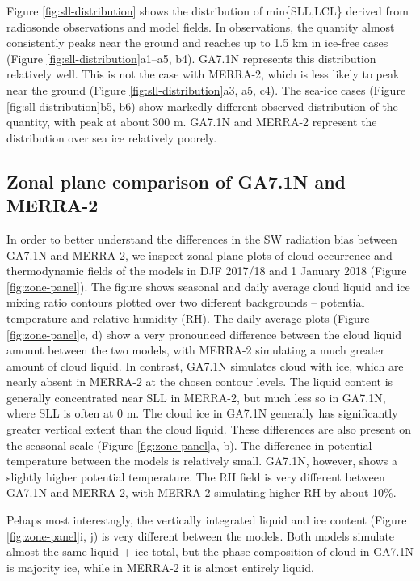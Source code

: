 Figure \ref{fig:sll-distribution} shows the distribution of min\{SLL,LCL\}
derived from radiosonde observations and model fields. In observations, the
quantity almost consistently peaks near the ground and reaches up to 1.5 km in
ice-free cases (Figure \ref{fig:sll-distribution}a1--a5, b4). GA7.1N represents
this distribution relatively well. This is not the case with MERRA-2, which is
less likely to peak near the ground (Figure \ref{fig:sll-distribution}a3, a5, c4).
The sea-ice cases (Figure \ref{fig:sll-distribution}b5, b6)
show markedly different observed distribution of the quantity, with peak at
about 300 m.  GA7.1N and MERRA-2 represent the distribution over sea ice
relatively poorely.

\subsection{Zonal plane comparison of GA7.1N and MERRA-2}
\label{sec:zonal-plane-comparison}

In order to better understand the differences in the SW radiation bias between
GA7.1N and MERRA-2, we inspect zonal plane plots of cloud occurrence and
thermodynamic fields of the models in DJF 2017/18 and 1 January 2018 (Figure
\ref{fig:zone-panel}). The figure shows seasonal and daily average cloud liquid
and ice mixing ratio contours plotted over two different backgrounds --
potential temperature and relative humidity (RH). The daily average plots
(Figure \ref{fig:zone-panel}c, d) show a very pronounced difference between
the cloud liquid amount between the two models, with MERRA-2 simulating a much
greater amount of cloud liquid. In contrast, GA7.1N simulates cloud with ice,
which are nearly absent in MERRA-2 at the chosen contour levels. The liquid
content is generally concentrated near SLL in MERRA-2, but much less so in GA7.1N,
where SLL is often at 0 m. The cloud ice in GA7.1N generally has significantly
greater vertical extent than the cloud liquid. These differences are also
present on the seasonal scale (Figure \ref{fig:zone-panel}a, b). The difference
in potential temperature between the models is relatively small. GA7.1N, however,
shows a slightly higher potential temperature.
The RH field is very different between GA7.1N and MERRA-2, with MERRA-2
simulating higher RH by about 10\%.

Pehaps most interestngly, the vertically integrated liquid and ice content
(Figure \ref{fig:zone-panel}i, j) is very different between the models. Both
models simulate almost the same liquid + ice total, but the phase composition
of cloud in GA7.1N is majority ice, while in MERRA-2 it is almost entirely
liquid.

